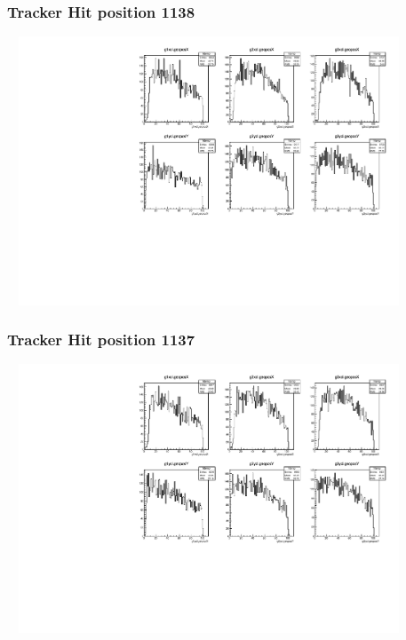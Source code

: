 \documentclass[slidestop,compress,mathserif]{beamer}
\begin{document}
\begin{frame}\frametitle{Tracker Hit position 1138}
	 \includegraphics[width=12cm,height=8cm]{Tracker_Hit_position_1138.pdf}
\end{frame}
\begin{frame}\frametitle{Tracker Hit position 1137}
	 \includegraphics[width=12cm,height=8cm]{Tracker_Hit_position_1137.pdf}
\end{frame}
\end{document}
